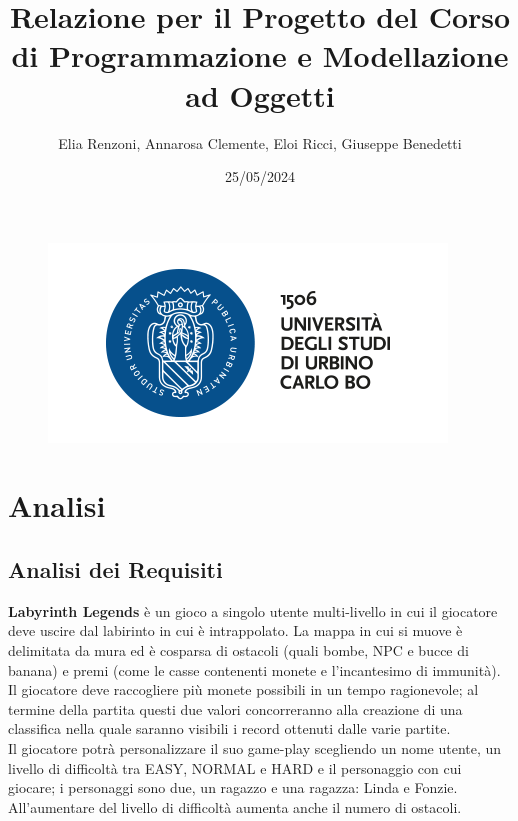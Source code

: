 \documentclass[12pt, letterpaper]{article}
\title{Relazione per il Progetto del Corso di Programmazione e Modellazione ad Oggetti}
\author{Elia Renzoni, Annarosa Clemente, Eloi Ricci, Giuseppe Benedetti}
\date{25/05/2024}
\begin{document}
\begin{figure}
    \centering
    \includegraphics[width=0.5\linewidth]{logo-uni.png}
\end{figure}

\maketitle

\newpage
\tableofcontents
\newpage
\section{Analisi}
    \subsection{Analisi dei Requisiti}
        \textbf{Labyrinth Legends} è un gioco a singolo utente multi-livello in cui il giocatore deve uscire dal  labirinto in cui è intrappolato.
        La mappa in cui si muove è delimitata da mura ed è cosparsa di ostacoli (quali bombe, NPC e bucce di banana) e premi (come le casse contenenti monete e l'incantesimo di immunità). 
        \\
        Il giocatore deve raccogliere più monete possibili in un tempo ragionevole; al termine della partita questi due valori concorreranno alla creazione di una classifica nella quale saranno visibili i record ottenuti dalle varie partite. 
        \\
        Il giocatore potrà personalizzare il suo game-play scegliendo un nome utente, un livello di difficoltà tra EASY, NORMAL e HARD e il personaggio con cui giocare; i personaggi sono due, un ragazzo e una ragazza: Linda e Fonzie.
        \\
        All'aumentare del livello di difficoltà aumenta anche il numero di ostacoli.
        \newpage
\end{document}
